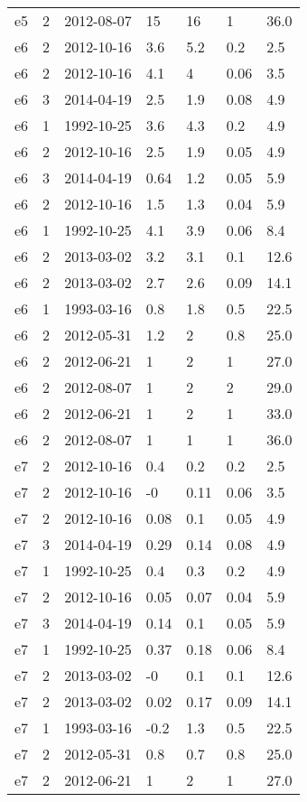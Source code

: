 \begin{table*}[htp]
\begin{tabular}{llll}
e5 & 2 & 2012-08-07 & 15 & 16 & 1 & 36.0 \\
e6 & 2 & 2012-10-16 & 3.6 & 5.2 & 0.2 & 2.5 \\
e6 & 2 & 2012-10-16 & 4.1 & 4 & 0.06 & 3.5 \\
e6 & 3 & 2014-04-19 & 2.5 & 1.9 & 0.08 & 4.9 \\
e6 & 1 & 1992-10-25 & 3.6 & 4.3 & 0.2 & 4.9 \\
e6 & 2 & 2012-10-16 & 2.5 & 1.9 & 0.05 & 4.9 \\
e6 & 3 & 2014-04-19 & 0.64 & 1.2 & 0.05 & 5.9 \\
e6 & 2 & 2012-10-16 & 1.5 & 1.3 & 0.04 & 5.9 \\
e6 & 1 & 1992-10-25 & 4.1 & 3.9 & 0.06 & 8.4 \\
e6 & 2 & 2013-03-02 & 3.2 & 3.1 & 0.1 & 12.6 \\
e6 & 2 & 2013-03-02 & 2.7 & 2.6 & 0.09 & 14.1 \\
e6 & 1 & 1993-03-16 & 0.8 & 1.8 & 0.5 & 22.5 \\
e6 & 2 & 2012-05-31 & 1.2 & 2 & 0.8 & 25.0 \\
e6 & 2 & 2012-06-21 & 1 & 2 & 1 & 27.0 \\
e6 & 2 & 2012-08-07 & 1 & 2 & 2 & 29.0 \\
e6 & 2 & 2012-06-21 & 1 & 2 & 1 & 33.0 \\
e6 & 2 & 2012-08-07 & 1 & 1 & 1 & 36.0 \\
e7 & 2 & 2012-10-16 & 0.4 & 0.2 & 0.2 & 2.5 \\
e7 & 2 & 2012-10-16 & -0 & 0.11 & 0.06 & 3.5 \\
e7 & 2 & 2012-10-16 & 0.08 & 0.1 & 0.05 & 4.9 \\
e7 & 3 & 2014-04-19 & 0.29 & 0.14 & 0.08 & 4.9 \\
e7 & 1 & 1992-10-25 & 0.4 & 0.3 & 0.2 & 4.9 \\
e7 & 2 & 2012-10-16 & 0.05 & 0.07 & 0.04 & 5.9 \\
e7 & 3 & 2014-04-19 & 0.14 & 0.1 & 0.05 & 5.9 \\
e7 & 1 & 1992-10-25 & 0.37 & 0.18 & 0.06 & 8.4 \\
e7 & 2 & 2013-03-02 & -0 & 0.1 & 0.1 & 12.6 \\
e7 & 2 & 2013-03-02 & 0.02 & 0.17 & 0.09 & 14.1 \\
e7 & 1 & 1993-03-16 & -0.2 & 1.3 & 0.5 & 22.5 \\
e7 & 2 & 2012-05-31 & 0.8 & 0.7 & 0.8 & 25.0 \\
e7 & 2 & 2012-06-21 & 1 & 2 & 1 & 27.0 \\

\end{tabular}
\end{table*}
